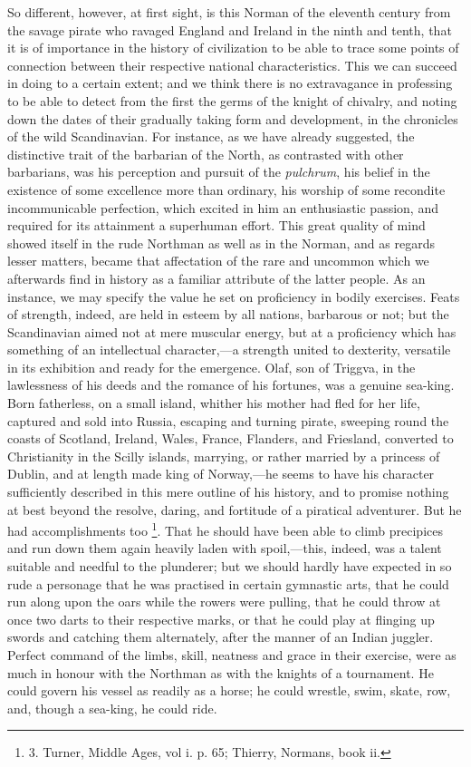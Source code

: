 So different, however, at
first sight, is this Norman of the eleventh century from the savage
pirate who ravaged England and Ireland in the ninth and tenth, that it
is of importance in the history of civilization to be able to trace
some points of connection between their respective national
characteristics. This we can succeed in doing to a certain extent; and
we think there is no extravagance in professing to be able to detect
from the first the germs of the knight of chivalry, and noting down
the dates of their gradually taking form and development, in the
chronicles of the wild Scandinavian. For instance, as we have already
suggested, the distinctive trait of the barbarian of the North, as
contrasted with other barbarians, was his perception and pursuit of
the \emph{pulchrum}, his belief in the existence of some excellence
more than ordinary, his worship of some recondite incommunicable
perfection, which excited in him an enthusiastic passion, and required
for its attainment a superhuman effort. This great quality of mind
showed itself in the rude Northman as well as in the Norman, and as
regards lesser matters, became that affectation of the rare and
uncommon which we afterwards find in history as a familiar attribute
of the latter people. As an instance, we may specify the value he set
on proficiency in bodily exercises. Feats of strength, indeed,
are held in esteem by all nations, barbarous or not; but the
Scandinavian aimed not at mere muscular energy, but at a proficiency
which has something of an intellectual character,—a strength united
to dexterity, versatile in its exhibition and ready for the emergence.
Olaf, son of Triggva, in the lawlessness of his deeds and the romance
of his fortunes, was a genuine sea-king. Born fatherless, on a small
island, whither his mother had fled for her life, captured and sold
into Russia, escaping and turning pirate, sweeping round the coasts of
Scotland, Ireland, Wales, France, Flanders, and Friesland, converted
to Christianity in the Scilly islands, marrying, or rather married by
a princess of Dublin, and at length made king of Norway,—he seems to
have his character sufficiently described in this mere outline of his
history, and to promise nothing at best beyond the resolve, daring,
and fortitude of a piratical adventurer. But he had accomplishments
too \footnote{3.
Turner, Middle Ages, vol i. p. 65; Thierry, Normans, book ii.}. That he should have
been able to climb precipices and run down them again heavily laden
with spoil,—this, indeed, was a talent suitable and needful to the
plunderer; but we should hardly have expected in so rude a personage
that he was practised in certain gymnastic arts, that he could run
along upon the oars while the rowers were pulling, that he could throw
at once two darts to their respective marks, or that he could play at
flinging up swords and catching them alternately, after the manner of
an Indian juggler. Perfect command of the limbs, skill, neatness and
grace in their exercise, were as much in honour with the Northman as
with the knights of a tournament. He could govern his vessel as
readily as a horse; he could wrestle, swim, skate, row, and, though a
sea-king, he could ride.

